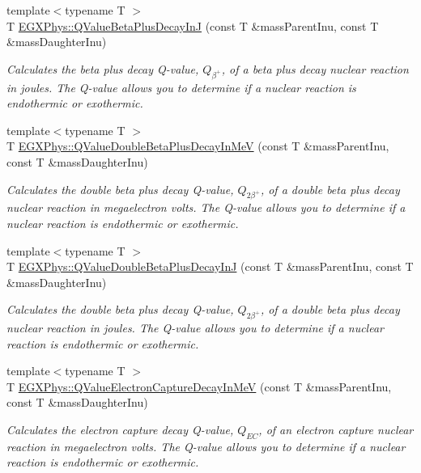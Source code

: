 \begin{DoxyCompactItemize}
{\footnotesize template$<$typename T $>$ }\\T \hyperlink{group___q_value_ga066fe9a9816a204c801c557a85bc60df}{E\+G\+X\+Phys\+::\+Q\+Value\+Beta\+Plus\+Decay\+InJ} (const T \&mass\+Parent\+Inu, const T \&mass\+Daughter\+Inu)
\begin{DoxyCompactList}\small\item\em Calculates the beta plus decay Q-\/value, $Q_{\beta^+}$, of a beta plus decay nuclear reaction in joules. The Q-\/value allows you to determine if a nuclear reaction is endothermic or exothermic. \end{DoxyCompactList}\item 
{\footnotesize template$<$typename T $>$ }\\T \hyperlink{group___q_value_ga3fb4b374bc1df69b96a66d0488bb2ba1}{E\+G\+X\+Phys\+::\+Q\+Value\+Double\+Beta\+Plus\+Decay\+In\+MeV} (const T \&mass\+Parent\+Inu, const T \&mass\+Daughter\+Inu)
\begin{DoxyCompactList}\small\item\em Calculates the double beta plus decay Q-\/value, $Q_{2\beta^+}$, of a double beta plus decay nuclear reaction in megaelectron volts. The Q-\/value allows you to determine if a nuclear reaction is endothermic or exothermic. \end{DoxyCompactList}\item 
{\footnotesize template$<$typename T $>$ }\\T \hyperlink{group___q_value_ga7d8dcc2691c2d4de9132e758e149ba51}{E\+G\+X\+Phys\+::\+Q\+Value\+Double\+Beta\+Plus\+Decay\+InJ} (const T \&mass\+Parent\+Inu, const T \&mass\+Daughter\+Inu)
\begin{DoxyCompactList}\small\item\em Calculates the double beta plus decay Q-\/value, $Q_{2\beta^+}$, of a double beta plus decay nuclear reaction in joules. The Q-\/value allows you to determine if a nuclear reaction is endothermic or exothermic. \end{DoxyCompactList}\item 
{\footnotesize template$<$typename T $>$ }\\T \hyperlink{group___q_value_ga9a6b76207e2ec60fd0ee3511582f9e26}{E\+G\+X\+Phys\+::\+Q\+Value\+Electron\+Capture\+Decay\+In\+MeV} (const T \&mass\+Parent\+Inu, const T \&mass\+Daughter\+Inu)
\begin{DoxyCompactList}\small\item\em Calculates the electron capture decay Q-\/value, $Q_{EC}$, of an electron capture nuclear reaction in megaelectron volts. The Q-\/value allows you to determine if a nuclear reaction is endothermic or exothermic. \end{DoxyCompactList}\item 

\end{DoxyCompactItemize}
